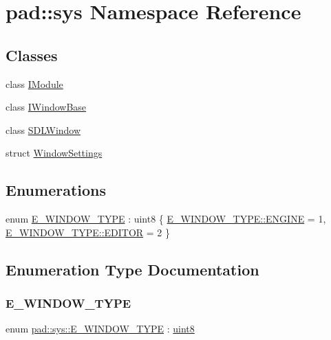 \hypertarget{namespacepad_1_1sys}{}\section{pad\+:\+:sys Namespace Reference}
\label{namespacepad_1_1sys}
\subsection*{Classes}
\begin{DoxyCompactItemize}
\item 
class \mbox{\hyperlink{classpad_1_1sys_1_1_i_module}{I\+Module}}
\item 
class \mbox{\hyperlink{classpad_1_1sys_1_1_i_window_base}{I\+Window\+Base}}
\item 
class \mbox{\hyperlink{classpad_1_1sys_1_1_s_d_l_window}{S\+D\+L\+Window}}
\item 
struct \mbox{\hyperlink{structpad_1_1sys_1_1_window_settings}{Window\+Settings}}
\end{DoxyCompactItemize}
\subsection*{Enumerations}
\begin{DoxyCompactItemize}
\item 
enum \mbox{\hyperlink{namespacepad_1_1sys_a33417a3109944d4ec323bc85137e4ea4}{E\+\_\+\+W\+I\+N\+D\+O\+W\+\_\+\+T\+Y\+PE}} \+: uint8 \{ \mbox{\hyperlink{namespacepad_1_1sys_a33417a3109944d4ec323bc85137e4ea4a1942d6cfa11aa1cf183f999aba8eac2e}{E\+\_\+\+W\+I\+N\+D\+O\+W\+\_\+\+T\+Y\+P\+E\+::\+E\+N\+G\+I\+NE}} = 1, 
\mbox{\hyperlink{namespacepad_1_1sys_a33417a3109944d4ec323bc85137e4ea4a4698850447aa09571776addcb6a2911b}{E\+\_\+\+W\+I\+N\+D\+O\+W\+\_\+\+T\+Y\+P\+E\+::\+E\+D\+I\+T\+OR}} = 2
 \}
\end{DoxyCompactItemize}


\subsection{Enumeration Type Documentation}
\mbox{\label{namespacepad_1_1sys_a33417a3109944d4ec323bc85137e4ea4}} 
\subsubsection{\texorpdfstring{E\+\_\+\+W\+I\+N\+D\+O\+W\+\_\+\+T\+Y\+PE}{E\_WINDOW\_TYPE}}
{\footnotesize\ttfamily enum \mbox{\hyperlink{namespacepad_1_1sys_a33417a3109944d4ec323bc85137e4ea4}{pad\+::sys\+::\+E\+\_\+\+W\+I\+N\+D\+O\+W\+\_\+\+T\+Y\+PE}} \+: \mbox{\hyperlink{namespacepad_ac2d92bf238fe849ef0eab976bc6f6040}{uint8}}\hspace{0.3cm}{\ttfamily [strong]}}

